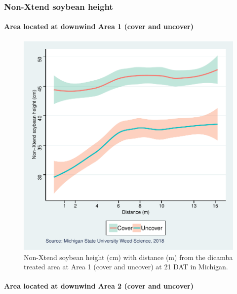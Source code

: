 \documentclass[]{article}
\let\oldparagraph\paragraph
\renewcommand{\paragraph}[1]{\oldparagraph{#1}\mbox{}}
\begin{document}
\pagebreak
\newpage

\subsubsection{Non-Xtend soybean
height}\label{non-xtend-soybean-height-3}

\paragraph{Area located at downwind Area 1 (cover and
uncover)}\label{area-located-at-downwind-area-1-cover-and-uncover-1}

\begin{figure}
\centering
\includegraphics{Report_files/figure-latex/unnamed-chunk-61-1.pdf}
\caption{Non-Xtend soybean height (cm) with distance (m) from the
dicamba treated area at Area 1 (cover and uncover) at 21 DAT in
Michigan.}
\end{figure}

\pagebreak
\newpage

\paragraph{Area located at downwind Area 2 (cover and
uncover)}\label{area-located-at-downwind-area-2-cover-and-uncover-1}
\end{document}
